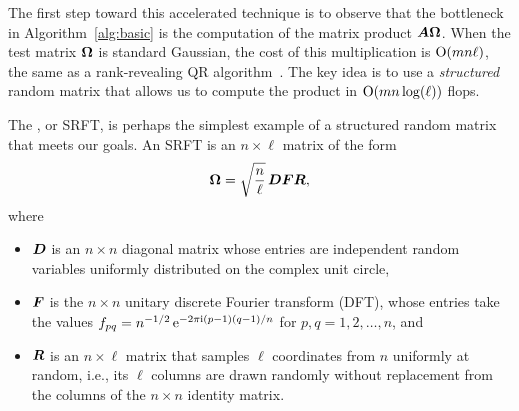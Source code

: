 \documentclass[final]{siamltex}
\newcounter{algorithm}[section]
\begin{document}

The first step toward this accelerated technique is to observe that
the bottleneck in Algorithm~\ref{alg:basic} is the computation of
the matrix product $\bm{A\Omega}$.  When the test matrix $\bm{\Omega}$
is standard Gaussian, the cost of this multiplication is $\mathrm{O}(mn\ell)$,
the same as a rank-revealing QR algorithm~\cite{gu_rrqr}.  The key
idea is to use a \emph{structured} random matrix that allows us to
compute the product in $\mathrm{O}(mn \log(\ell))$ flops.

The , or SRFT, is perhaps the
simplest example of a structured random matrix that meets our goals.
An SRFT is an $n \times \ell$ matrix of the form
\begin{equation}
\label{eq:def_srft}
\mtx{\Omega} = \sqrt{\frac{n}{\ell}} \, \mtx{DFR},
\end{equation}
where
\lsp
\begin{itemize}
\item   $\bm{D}$ is an $n \times n$ diagonal matrix whose entries are
independent random variables uniformly distributed on the complex unit circle,

\item   $\bm{F}$ is the $n \times n$ unitary discrete Fourier transform (DFT),
whose entries take the values $f_{pq} = n^{-1/2} \, \mathrm{e}^{-2\pi\mathrm{i} (p-1)(q-1)/n}$ for $p, q = 1, 2, \dots, n$, and

\item   $\bm{R}$ is an $n \times \ell$ matrix that samples $\ell$ coordinates
from $n$ uniformly at random, i.e., its $\ell$ columns are drawn randomly
without replacement from the columns of the $n \times n$ identity matrix.
\end{itemize}
\lsp
\end{document}
